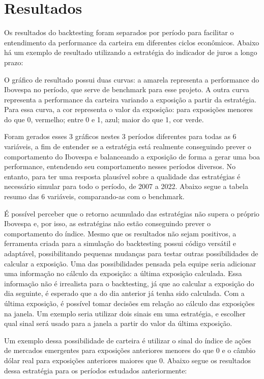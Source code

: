 \section{Resultados}

Os resultados do backtesting foram separados por período para facilitar o entendimento da performance da carteira em diferentes ciclos econômicos. Abaixo há um exemplo de resultado utilizando a estratégia do indicador de juros a longo prazo:

O gráfico de resultado possui duas curvas: a amarela representa a performance do Ibovespa no período, que serve de benchmark para esse projeto. A outra curva representa a performance da carteira variando a exposição a partir da estratégia. Para essa curva, a cor representa o valor da exposição: para exposições menores do que 0, vermelho; entre 0 e 1, azul; maior do que 1, cor verde.

Foram gerados esses 3 gráficos nestes 3 períodos diferentes para todas as 6 variáveis, a fim de entender se a estratégia está realmente conseguindo prever o comportamento do Ibovespa e balanceando a exposição de forma a gerar uma boa performance, entendendo seu comportamento nesses períodos diversos. No entanto, para ter uma resposta plausível sobre a qualidade das estratégias é necessário simular para todo o período, de 2007 a 2022. Abaixo segue a tabela resumo das 6 variáveis, comparando-as com o benchmark.
 
É possível perceber que o retorno acumulado das estratégias não supera o próprio Ibovespa e, por isso, as estratégias não estão conseguindo prever o comportamento do índice. Mesmo que os resultados não sejam positivos, a ferramenta criada para a simulação do backtesting possui código versátil e adaptável, possibilitando pequenas mudanças para testar outras possibilidades de calcular a exposição. 
Uma das possibilidades pensada pela equipe seria adicionar uma informação no cálculo da exposição: a última exposição calculada. Essa informação não é irrealista para o backtesting, já que ao calcular a exposição do dia seguinte, é esperado que a do dia anterior já tenha sido calculada. Com a última exposição, é possível tomar decisões em relação ao cálculo das exposições na janela. Um exemplo seria utilizar dois sinais em uma estratégia, e escolher qual sinal será usado para a janela a partir do valor da última exposição. 

Um exemplo dessa possibilidade de carteira é utilizar o sinal do índice de ações de mercados emergentes para exposições anteriores menores do que 0 e o câmbio dólar real para exposições anteriores maiores que 0. Abaixo segue os resultados dessa estratégia para os períodos estudados anteriormente:

